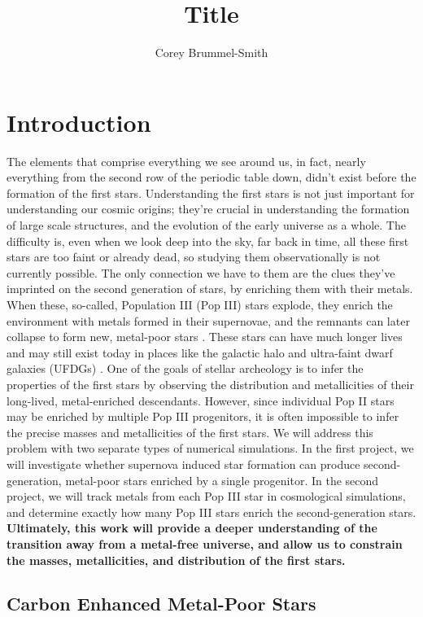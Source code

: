 \documentclass[letterpaper, 12pt]{article}
\begin{document}
\author{Corey Brummel-Smith}
\title{Title}

\section{Introduction}

The elements that comprise everything we see around us, in fact, nearly everything from the second row of the periodic table down, didn't exist before the formation of the first stars. Understanding the first stars is not just important for understanding our cosmic origins; they're crucial in understanding the formation of large scale structures, and the evolution of the early universe as a whole. The difficulty is, even when we look deep into the sky, far back in time, all these first stars are too faint or already dead, so studying them observationally is not currently possible. The only connection we have to them are the clues they've imprinted on the second generation of stars, by enriching them with their metals. When these, so-called, Population III (Pop III) stars explode, they enrich the environment with metals formed in their supernovae, and the remnants can later collapse to form new, metal-poor stars \citep{Chiaki2019}. These stars can have much longer lives and may still exist today in places like the galactic halo and ultra-faint dwarf galaxies (UFDGs) \citep{Kirby2008}. One of the goals of stellar archeology is to infer the properties of the first stars by observing the distribution and metallicities of their long-lived, metal-enriched descendants. However, since individual Pop II stars may be enriched by multiple Pop III progenitors, it is often impossible to infer the precise masses and metallicities of the first stars. We will address this problem with two separate types of numerical simulations. In the first project, we will investigate whether supernova induced star formation can produce second-generation, metal-poor stars enriched by a single progenitor. In the second project, we will track metals from each Pop III star in cosmological simulations, and determine exactly how many Pop III stars enrich the second-generation stars. \textbf{Ultimately, this work will provide a deeper understanding of the transition away from a metal-free universe, and allow us to constrain the masses, metallicities, and distribution of the first stars.}

\subsection{Carbon Enhanced Metal-Poor Stars}
\end{document}
